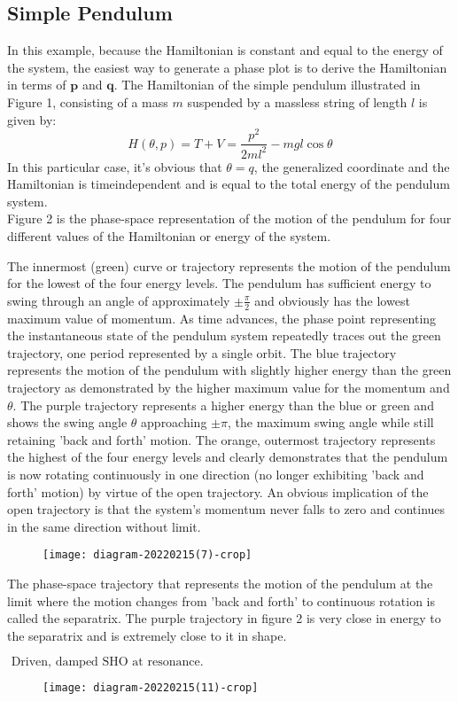 \subsection{ Simple Pendulum}
In this example, because the Hamiltonian is constant and equal to the energy of the system, the easiest way to generate a phase plot is to derive the Hamiltonian in terms of $\boldsymbol{p}$ and $\boldsymbol{q}$. The Hamiltonian of the simple pendulum illustrated in Figure 1, consisting of a mass $m$ suspended by a massless string of length $l$ is given by:
$$
H(\theta, p)=T+V=\frac{p^{2}}{2 m l^{2}}-m g l \cos \theta
$$
In this particular case, it's obvious that $\theta=q$, the generalized coordinate and the Hamiltonian is timeindependent and is equal to the total energy of the pendulum system.\\
Figure 2 is the phase-space representation of the motion of the pendulum for four different values of the Hamiltonian or energy of the system.\\
 \par The innermost (green) curve or trajectory represents the motion of the pendulum for the lowest of the four energy levels. The pendulum has sufficient energy to swing through an angle of approximately $\pm \frac{\pi}{2}$ and obviously has the lowest maximum value of momentum. As time advances, the phase point representing the instantaneous state of the pendulum system repeatedly traces out the green trajectory, one period represented by a single orbit.
The blue trajectory represents the motion of the pendulum with slightly higher energy than the green trajectory as demonstrated by the higher maximum value for the momentum and $\theta$.
The purple trajectory represents a higher energy than the blue or green and shows the swing angle $\theta$ approaching $\pm \pi$, the maximum swing angle while still retaining 'back and forth' motion.
The orange, outermost trajectory represents the highest of the four energy levels and clearly demonstrates that the pendulum is now rotating continuously in one direction (no longer exhibiting 'back and forth' motion) by virtue of the open trajectory. An obvious implication of the open trajectory is that the system's momentum never falls to zero and continues in the same direction without limit.\\
\begin{figure}[H]
	\centering
	\texttt{[image: diagram-20220215(7)-crop]}
	\caption{}
	\label{}
\end{figure}
The phase-space trajectory that represents the motion of the pendulum at the limit where the motion changes from 'back and forth' to continuous rotation is called the separatrix. The purple trajectory in figure 2 is very close in energy to the separatrix and is extremely close to it in shape.\\
\begin{note}
	$\text { Driven, damped SHO at resonance. }$\\
	\begin{figure}[H]
		\centering
		\texttt{[image: diagram-20220215(11)-crop]}
		\caption{}
		\label{}
	\end{figure}
\end{note}
